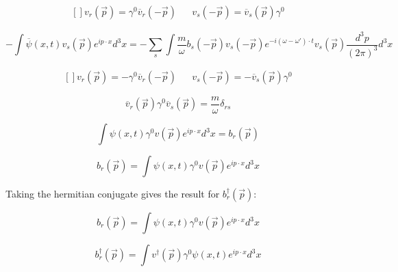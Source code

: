 \documentclass[a4]{article}
\begin{document}
    \begin{equation}
        \begin{aligned}[]
            v_{r} (\vec{p}) = \gamma^0 \overline{v}_{r} (- \vec{p}) & & v_{s} (- \vec{p}) = \overline{v}_{s} (\vec{p}) \gamma^0
        \end{aligned}
    \end{equation}

    \begin{equation}
        - \int \overline{\psi} (x, t) v_{s} (\vec{p}) e^{i p \cdot x} d^3 x = - \sum_{s} \int \frac{m}{\omega} b_s (- \vec{p}) v_s (- \vec{p}) e^{- i (\omega - \omega') \cdot t}  v_{s} (\vec{p}) \frac{d^{3} p}{(2 \pi)^3} d^3 x
    \end{equation}

    \begin{equation}
        \begin{aligned}[]
            v_{r} (\vec{p}) = - \gamma^0 \overline{v}_{r} (- \vec{p}) & & v_{s} (- \vec{p}) = - \overline{v}_{s} (\vec{p}) \gamma^0
        \end{aligned}
    \end{equation}

    \begin{equation}
        \overline{v}_{r} (\vec{p}) \gamma^0 \overline{v}_{s} (\vec{p}) = \frac{m}{\omega} \delta_{rs}
    \end{equation}

    \begin{equation}
        \int \psi (x, t) \gamma^0 v (\vec{p}) e^{i p \cdot x} d^3 x = b_r (\vec{p})
    \end{equation}
    
    \begin{framed}
        \begin{equation}
            b_r (\vec{p}) = \int \psi (x, t) \gamma^0 v (\vec{p}) e^{i p \cdot x} d^3 x
        \end{equation}
    \end{framed}

    Taking the hermitian conjugate gives the result for $b_{r}^{\dagger} (\vec{p})$:

    \begin{equation}
        b_r (\vec{p}) = \int \psi (x, t) \gamma^0 v (\vec{p}) e^{i p \cdot x} d^3 x
    \end{equation}

    \begin{equation}
        b_r^\dagger (\vec{p}) = \int v^{\dagger} (\vec{p}) \gamma^0 \psi (x, t) e^{i p \cdot x} d^3 x
    \end{equation}
\end{document}
